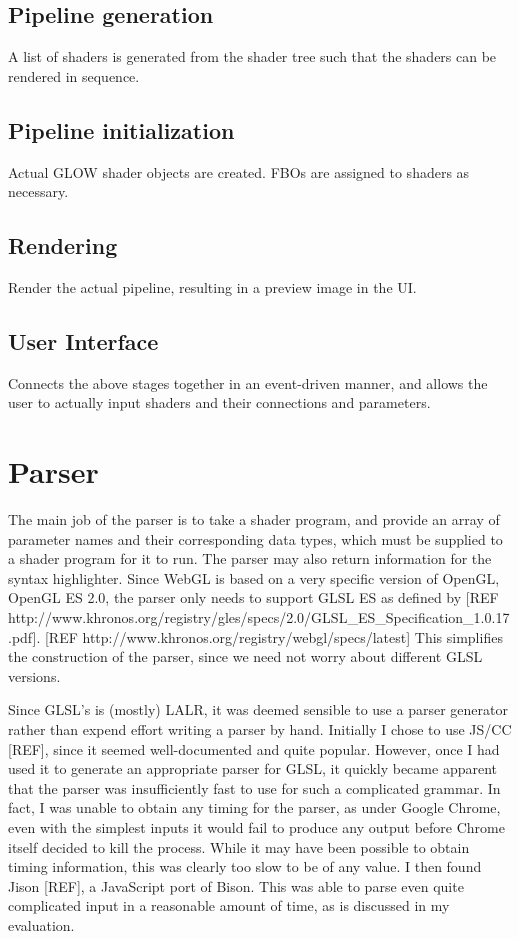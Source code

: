 \documentclass[12pt,twoside,notitlepage]{report}
\begin{document}
\subsection{Pipeline generation}
A list of shaders is generated from the shader tree such that the shaders can be rendered in sequence.
\subsection{Pipeline initialization}
Actual GLOW shader objects are created. FBOs are assigned to shaders as necessary.
\subsection{Rendering}
Render the actual pipeline, resulting in a preview image in the UI.
\subsection{User Interface}
Connects the above stages together in an event-driven manner, and allows the user to actually input shaders and their connections and parameters.

\section{Parser}
The main job of the parser is to take a shader program, and provide an array of parameter names and their corresponding data types, which must be supplied to a shader program for it to run. The parser may also return information for the syntax highlighter. Since WebGL is based on a very specific version of OpenGL, OpenGL ES 2.0, the parser only needs to support GLSL ES as defined by [REF http://www.khronos.org/registry/gles/specs/2.0/GLSL_ES_Specification_1.0.17.pdf]. [REF http://www.khronos.org/registry/webgl/specs/latest] This simplifies the construction of the parser, since we need not worry about different GLSL versions.

Since GLSL's is (mostly) LALR, it was deemed sensible to use a parser generator rather than expend  effort writing a parser by hand. Initially I chose to use JS/CC [REF], since it seemed well-documented and quite popular. However, once I had used it to generate an appropriate parser for GLSL, it quickly became apparent that the parser was insufficiently fast to use for such a complicated grammar. In fact, I was unable to obtain any timing for the parser, as under Google Chrome, even with the simplest inputs it would fail to produce any output before Chrome itself decided to kill the process. While it may have been possible to obtain timing information, this was clearly too slow to be of any value. I then found Jison [REF], a JavaScript port of Bison. This was able to parse even quite complicated input in a reasonable amount of time, as is discussed in my evaluation.
\end{document}
